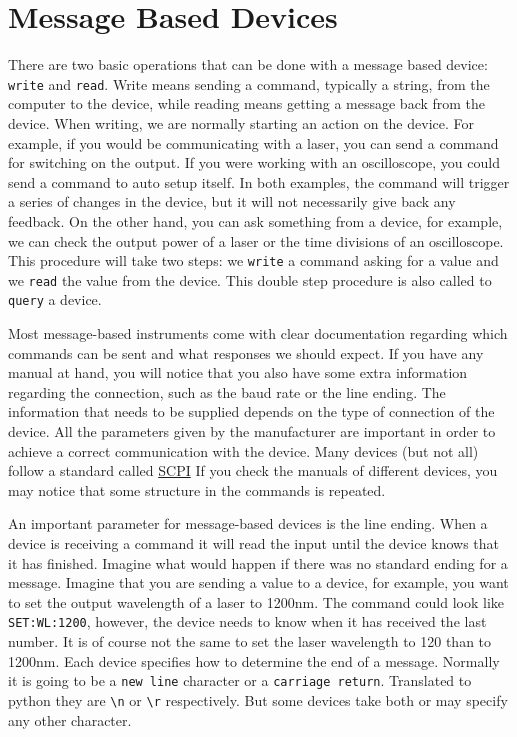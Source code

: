 \section{Message Based Devices}\label{message-baseddevices}

There are two basic operations that can be done with a message based
device: \texttt{write} and \texttt{read}. Write means sending a command,
typically a string, from the computer to the device, while reading means
getting a message back from the device. When writing, we are normally
starting an action on the device. For example, if you would be
communicating with a laser, you can send a command for switching on the
output. If you were working with an oscilloscope, you could send a
command to auto setup itself. In both examples, the command will trigger
a series of changes in the device, but it will not necessarily give back
any feedback. On the other hand, you can ask something from a device,
for example, we can check the output power of a laser or the time
divisions of an oscilloscope. This procedure will take two steps: we
\texttt{write} a command asking for a value and we \texttt{read} the
value from the device. This double step procedure is also called to
\texttt{query} a device.

Most message-based instruments come with clear documentation regarding
which commands can be sent and what responses we should expect. If you
have any manual at hand, you will notice that you also have some extra
information regarding the connection, such as the baud rate or the line
ending. The information that needs to be supplied depends on the type of
connection of the device. All the parameters given by the manufacturer
are important in order to achieve a correct communication with the
device. Many devices (but not all) follow a standard called 
\href{https://en.wikipedia.org/wiki/Standard_Commands_for_Programmable_Instruments}{SCPI} 
If you check the manuals of different devices, you may notice that some
structure in the commands is repeated.

An important parameter for message-based devices is the line ending.
When a device is receiving a command it will read the input until the
device knows that it has finished. Imagine what would happen if there
was no standard ending for a message. Imagine that you are sending a
value to a device, for example, you want to set the output wavelength of
a laser to 1200nm. The command could look like \texttt{SET:WL:1200},
however, the device needs to know when it has received the last number.
It is of course not the same to set the laser wavelength to 120 than to
1200nm. Each device specifies how to determine the end of a message.
Normally it is going to be a \texttt{new\ line} character or a
\texttt{carriage\ return}. Translated to python they are
\texttt{\textbackslash{}n} or \texttt{\textbackslash{}r} respectively.
But some devices take both or may specify any other character.

